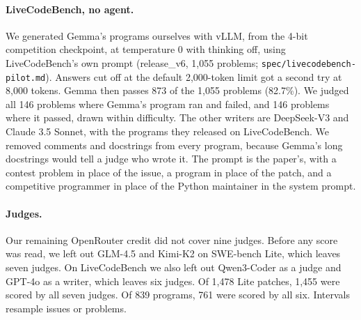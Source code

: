 \documentclass[10pt,letterpaper]{article}
\begin{document}
\paragraph{LiveCodeBench, no agent.} We generated Gemma's programs ourselves with vLLM, from the 4-bit competition
checkpoint, at temperature 0 with thinking off, using LiveCodeBench's own prompt (release\_v6, 1,055 problems;
\texttt{spec/livecodebench-pilot.md}). Answers cut off at the default 2,000-token limit got a second try at 8,000
tokens. Gemma then passes 873 of the 1,055 problems (82.7\%). We judged all 146 problems where Gemma's program ran and
failed, and 146 problems where it passed, drawn within difficulty. The other writers are DeepSeek-V3 and Claude 3.5
Sonnet, with the programs they released on LiveCodeBench. We removed comments and docstrings from every program,
because Gemma's long docstrings would tell a judge who wrote it. The prompt is the paper's, with a contest problem in
place of the issue, a program in place of the patch, and a competitive programmer in place of the Python maintainer in
the system prompt.

\paragraph{Judges.} Our remaining OpenRouter credit did not cover nine judges. Before any score was read, we left out
GLM-4.5 and Kimi-K2 on SWE-bench Lite, which leaves seven judges. On LiveCodeBench we also left out Qwen3-Coder as a
judge and GPT-4o as a writer, which leaves six judges. Of 1,478 Lite patches, 1,455 were scored by all seven judges.
Of 839 programs, 761 were scored by all six. Intervals resample issues or problems.
\end{document}
